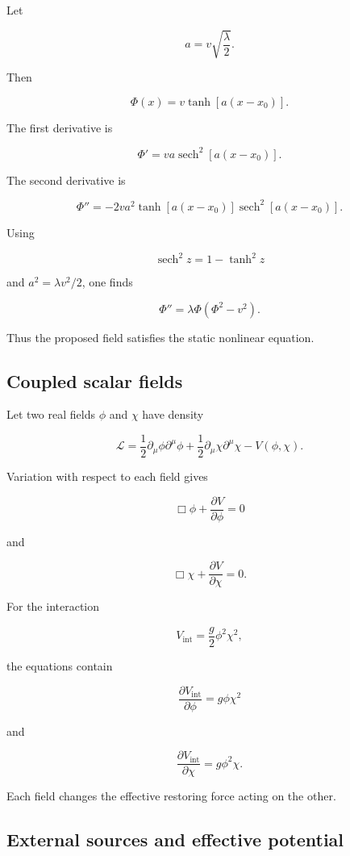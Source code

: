 Let

\[
a
=
v\sqrt{
\frac{\lambda}{2}
}.
\]

Then

\[
\Phi(x)=v\tanh[a(x-x_{0})].
\]

The first derivative is

\[
\Phi'
=
va\operatorname{sech}^{2}[a(x-x_{0})].
\]

The second derivative is

\[
\Phi''
=
-2va^{2}
\tanh[a(x-x_{0})]
\operatorname{sech}^{2}[a(x-x_{0})].
\]

Using

\[
\operatorname{sech}^{2}z
=
1-\tanh^{2}z
\]

and \(a^{2}=\lambda v^{2}/2\), one finds

\[
\Phi''
=
\lambda\Phi(\Phi^{2}-v^{2}).
\]

Thus the proposed field satisfies the static nonlinear equation.

\subsection{Coupled scalar fields}

Let two real fields \(\phi\) and \(\chi\) have density

\[
\mathcal{L}
=
\frac{1}{2}
\partial_{\mu}\phi\partial^{\mu}\phi
+
\frac{1}{2}
\partial_{\mu}\chi\partial^{\mu}\chi
-
V(\phi,\chi).
\]

Variation with respect to each field gives

\[
\boxed{
\Box\phi
+
\frac{\partial V}{\partial\phi}
=0
}
\]

and

\[
\boxed{
\Box\chi
+
\frac{\partial V}{\partial\chi}
=0
}.
\]

For the interaction

\[
V_{\mathrm{int}}
=
\frac{g}{2}
\phi^{2}\chi^{2},
\]

the equations contain

\[
\frac{\partial V_{\mathrm{int}}}{\partial\phi}
=
g\phi\chi^{2}
\]

and

\[
\frac{\partial V_{\mathrm{int}}}{\partial\chi}
=
g\phi^{2}\chi.
\]

Each field changes the effective restoring force acting on the other.

\subsection{External sources and effective potential}

